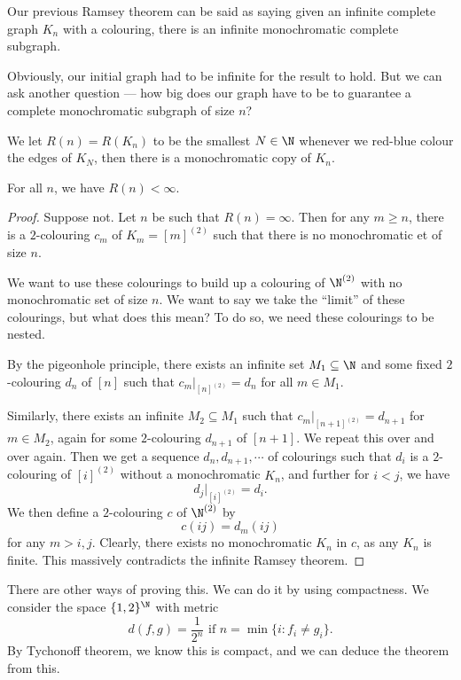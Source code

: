 \documentclass[a4paper]{article}
\begin{document}
Our previous Ramsey theorem can be said as saying given an infinite complete graph $K_n$ with a colouring, there is an infinite monochromatic complete subgraph.

Obviously, our initial graph had to be infinite for the result to hold. But we can ask another question --- how big does our graph have to be to guarantee a complete monochromatic subgraph of size $n$?
\begin{defi}
  We let $R(n) = R(K_n)$ to be the smallest $N \in \N$ whenever we red-blue colour the edges of $K_N$, then there is a monochromatic copy of $K_n$.
\end{defi}

\begin{thm} %
  For all $n$, we have $R(n) < \infty$.
\end{thm}

\begin{proof}
  Suppose not. Let $n$ be such that $R(n) = \infty$. Then for any $m \geq n$, there is a $2$-colouring $c_m$ of $K_m = [m]^{(2)}$ such that there is no monochromatic et of size $n$.

  We want to use these colourings to build up a colouring of $\N^{(2)}$ with no monochromatic set of size $n$. We want to say we take the ``limit'' of these colourings, but what does this mean? To do so, we need these colourings to be nested.

  By the pigeonhole principle, there exists an infinite set $M_1 \subseteq \N$ and some fixed $2$-colouring $d_n$ of $[n]$ such that $c_m|_{[n]^{(2)}} = d_n$ for all $m \in M_1$.

  Similarly, there exists an infinite $M_2 \subseteq M_1$ such that $c_m|_{[n + 1]^{(2)}} = d_{n + 1}$ for $m \in M_2$, again for some $2$-colouring $d_{n + 1}$ of $[n + 1]$. We repeat this over and over again. Then we get a sequence $d_n, d_{n + 1}, \cdots$ of colourings such that $d_i$ is a $2$-colouring of $[i]^{(2)}$ without a monochromatic $K_n$, and further for $i < j$, we have
  \[
    d_j|_{[i]^{(2)}} = d_i.
  \]
  We then define a $2$-colouring $c$ of $\N^{(2)}$ by
  \[
    c(ij) = d_m(ij)
  \]
  for any $m > i, j$. Clearly, there exists no monochromatic $K_n$ in $c$, as any $K_n$ is finite. This massively contradicts the infinite Ramsey theorem.
\end{proof}
There are other ways of proving this. We can do it by using compactness. We consider the space $\{1, 2\}^\N$ with metric
\[
  d(f, g) = \frac{1}{2^n}\text{ if } n = \min \{i: f_i \not= g_i\}.
\]
By Tychonoff theorem, we know this is compact, and we can deduce the theorem from this. %
\end{document}
